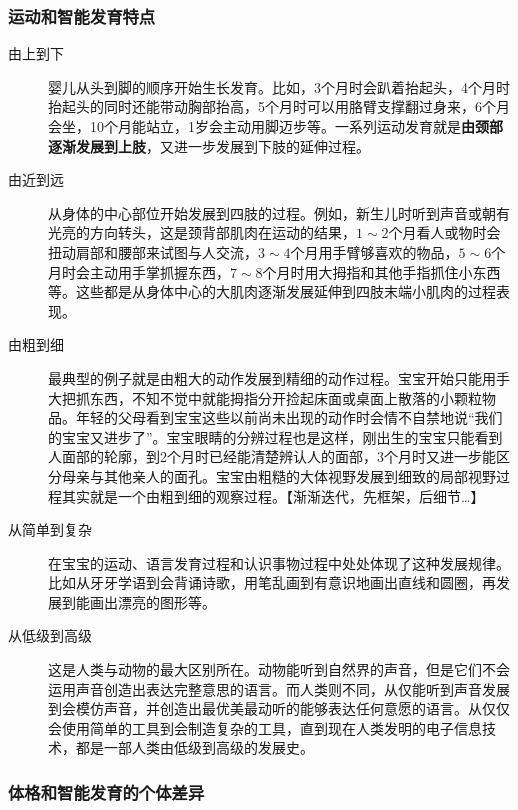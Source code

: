 \subsubsection{运动和智能发育特点}%

\begin{description}
\item[由上到下]
婴儿从头到脚的顺序开始生长发育。比如，3个月时会趴着抬起头，4个月时抬起头的同时还能带动胸部抬高，5个月时可以用胳臂支撑翻过身来，6个月会坐，10个月能站立，1岁会主动用脚迈步等。一系列运动发育就是\textbf{由颈部逐渐发展到上肢}，又进一步发展到下肢的延伸过程。

\item[由近到远]
从身体的中心部位开始发展到四肢的过程。例如，新生儿时听到声音或朝有光亮的方向转头，这是颈背部肌肉在运动的结果，$1\sim{}2$个月看人或物时会扭动肩部和腰部来试图与人交流，$3\sim{}4$个月用手臂够喜欢的物品，$5\sim{}6$个月时会主动用手掌抓握东西，$7\sim{}8$个月时用大拇指和其他手指抓住小东西等。这些都是从身体中心的大肌肉逐渐发展延伸到四肢末端小肌肉的过程表现。

\item[由粗到细]
最典型的例子就是由粗大的动作发展到精细的动作过程。宝宝开始只能用手大把抓东西，不知不觉中就能拇指分开捡起床面或桌面上散落的小颗粒物品。年轻的父母看到宝宝这些以前尚未出现的动作时会情不自禁地说``我们的宝宝又进步了''。宝宝眼睛的分辨过程也是这样，刚出生的宝宝只能看到人面部的轮廓，到2个月时已经能清楚辨认人的面部，3个月时又进一步能区分母亲与其他亲人的面孔。宝宝由粗糙的大体视野发展到细致的局部视野过程其实就是一个由粗到细的观察过程。【渐渐迭代，先框架，后细节\ldots】

\item[从简单到复杂]
在宝宝的运动、语言发育过程和认识事物过程中处处体现了这种发展规律。比如从牙牙学语到会背诵诗歌，用笔乱画到有意识地画出直线和圆圈，再发展到能画出漂亮的图形等。

\item[从低级到高级]
这是人类与动物的最大区别所在。动物能听到自然界的声音，但是它们不会运用声音创造出表达完整意思的语言。而人类则不同，从仅能听到声音发展到会模仿声音，并创造出最优美最动听的能够表达任何意愿的语言。从仅仅会使用简单的工具到会制造复杂的工具，直到现在人类发明的电子信息技术，都是一部人类由低级到高级的发展史。
\end{description}

\subsubsection{体格和智能发育的个体差异}%

